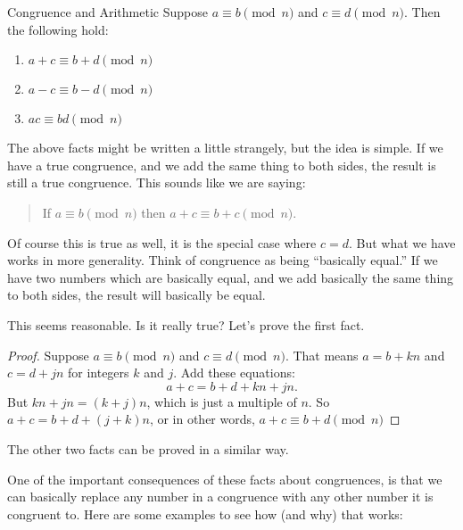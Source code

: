 \documentclass[12pt]{article}
\begin{document}
\begin{defbox}{Congruence and Arithmetic}
	Suppose $a \equiv b \pmod{n}$ and $c \equiv d \pmod{n}$.  Then the following hold:
	\begin{enumerate}
		\item $a+c \equiv b+d \pmod{n}$
		\item $a-c \equiv b-d \pmod{n}$
		\item $ac \equiv bd \pmod{n}$	
	\end{enumerate}
\end{defbox}

The above facts might be written a little strangely, but the idea is simple.  If we have a true congruence, and we add the same thing to both sides, the result is still a true congruence.  This sounds like we are saying:
\begin{quote}
If $a \equiv b \pmod{n}$ then $a+c \equiv b+c \pmod{n}$.
\end{quote}

Of course this is true as well, it is the special case where $c = d$.  But what we have works in more generality.  Think of congruence as being ``basically equal.''  If we have two numbers which are basically equal, and we add basically the same thing to both sides, the result will basically be equal.

This seems reasonable.  Is it really true?  Let's prove the first fact.

\begin{proof}
	Suppose $a \equiv b \pmod{n}$ and $c \equiv d \pmod{n}$.  That means $a = b + kn$ and $c = d + jn$ for integers $k$ and $j$.  Add these equations: \[a+c = b+d + kn + jn.\]  But $kn + jn = (k+j)n$, which is just a multiple of $n$.  So $a+c = b+d + (j+k)n$, or in other words, $a+c \equiv b+d \pmod{n}$
\end{proof}

The other two facts can be proved in a similar way.  

One of the important consequences of these facts about congruences, is that we can basically replace any number in a congruence with any other number it is congruent to.  Here are some examples to see how (and why) that works:
\end{document}
